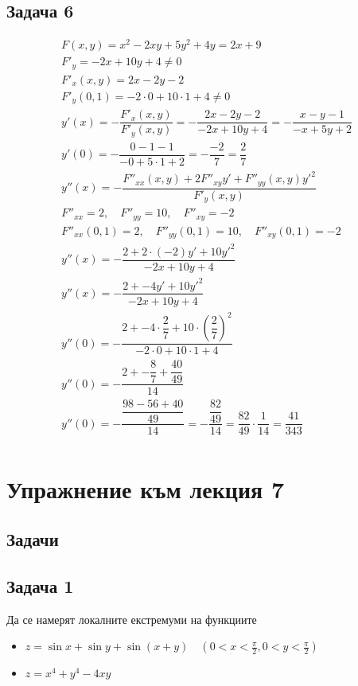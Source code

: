 \documentclass[a4paper,fleqn,12pt]{article}
\theoremstyle{definition}
\begin{document}
\subsection*{Задача 6}
\begin{gather*}
F(x,y) = x^2 - 2xy + 5y^2 + 4y = 2x + 9\\
F'_y = -2x + 10y + 4 \neq 0\\
F'_x(x,y) = 2x - 2y - 2\\
F'_y(0,1) = -2 \cdot 0 + 10 \cdot 1 + 4 \neq 0\\
y'(x) = - \dfrac{F'_x(x,y)}{F'_y(x,y)} = - \dfrac{2x - 2y - 2}{-2x + 10y + 4} = - \dfrac{x - y - 1}{- x + 5y + 2}\\
y'(0) = - \dfrac{0 - 1 - 1}{- 0 + 5 \cdot 1 + 2} = - \dfrac{-2}{7} = \dfrac{2}{7}\\
y''(x) = - \dfrac{F''_{xx}(x,y) + 2F''_{xy}y' + F''_{yy}(x,y)y'^2}{F'_y(x,y)}\\
F''_{xx} = 2, \quad F''_{yy} = 10, \quad F''_{xy} = -2\\
F''_{xx}(0,1) = 2, \quad F''_{yy}(0,1) = 10, \quad F''_{xy}(0,1) = -2\\
y''(x) = - \dfrac{2 + 2 \cdot (-2)y' + 10y'^2}{-2x + 10y + 4}\\
y''(x) = - \dfrac{2 + - 4y' + 10y'^2}{-2x + 10y + 4}\\
y''(0) = - \dfrac{2 + - 4 \cdot \dfrac{2}{7} + 10 \cdot \left( \dfrac{2}{7} \right) ^2}{-2 \cdot 0 + 10 \cdot 1 + 4}\\
y''(0) = - \dfrac{2 + - \dfrac{8}{7} + \dfrac{40}{49}}{14}\\
y''(0) = - \dfrac{\dfrac{98 - 56 + 40}{49}}{14} = - \dfrac{\dfrac{82}{49}}{14} = \dfrac{82}{49} \cdot \dfrac{1}{14} = \dfrac{41}{343}\\
\end{gather*}

\newpage
\section{Упражнение към лекция 7}

\subsection{Задачи}

\subsection*{Задача 1}
Да се намерят локалните екстремуми на функциите
\begin{itemize}
\item $z = \sin{x} + \sin{y} + \sin{(x+y)} \quad (0 < x < \frac{\pi}{2}, 0 < y < \frac{\pi}{2})$
\item $z = x^4 + y^4 - 4xy$
\end{itemize}
\end{document}
